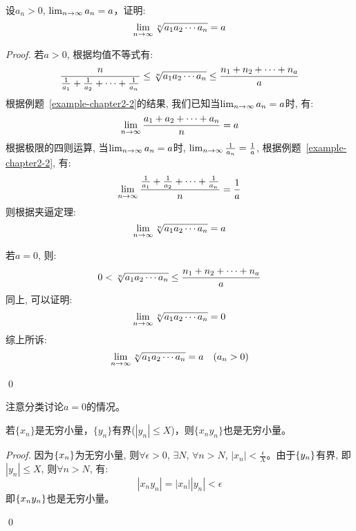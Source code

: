 \begin{example}
    设$a_n > 0$, $\lim_{n \to \infty } a_n = a$，证明:
    \begin{equation*}
        \lim_{n \to \infty } \sqrt[n]{a_1a_2\cdots a_n} = a
    \end{equation*}
\end{example}
\begin{proof}
    若$a > 0$, 根据均值不等式有:
    \begin{equation*}
        \frac{n}{\frac{1}{a_1}+\frac{1}{a_2}+\cdots+\frac{1}{a_n}} \le \sqrt[n]{a_1a_2\cdots a_n} \le \frac{n_1 + n_2 + \cdots + n_a}{a}
    \end{equation*}
    根据例题~\ref{example-chapter2-2}的结果, 我们已知当$\lim_{n \to \infty } a_n = a$时, 有:
    \begin{equation*}
        \lim_{n \to \infty } \frac{a_1 + a_2 + \cdots + a_n}{n} = a
    \end{equation*}
    根据极限的四则运算, 当$\lim_{n \to \infty } a_n = a$时, $\lim_{n \to \infty } \frac{1}{a_n} = \frac{1}{a}$, 根据例题~\ref{example-chapter2-2}, 有:
    \begin{equation*}
        \lim_{n \to \infty } \frac{\frac{1}{a_1}+\frac{1}{a_2}+\cdots+\frac{1}{a_n}}{n} = \frac{1}{a}
    \end{equation*}
    则根据夹逼定理:
    \begin{equation*}
        \lim_{n \to \infty } \sqrt[n]{a_1a_2\cdots a_n} = a
    \end{equation*}

    若$a = 0$, 则:
    \begin{equation*}
        0 < \sqrt[n]{a_1a_2\cdots a_n} \le \frac{n_1 + n_2 + \cdots + n_a}{a}
    \end{equation*}
    同上, 可以证明:
    \begin{equation*}
        \lim_{n \to \infty } \sqrt[n]{a_1a_2\cdots a_n} = 0
    \end{equation*}
    综上所诉:
    \begin{equation*}
        \lim_{n \to \infty } \sqrt[n]{a_1a_2\cdots a_n} = a \quad (a_n > 0)
    \end{equation*}    

    \qed
\end{proof}
\begin{remark}
    注意分类讨论$a = 0$的情况。
\end{remark}

\begin{proposition}
    若$\{ x_n \}$是无穷小量，$\{ y_n \}$有界($| y_n | \le X$)，则$\{ x_n y_n \}$也是无穷小量。
\end{proposition}
\begin{proof}
    因为$\left\{ x_n\right\}$为无穷小量, 则$\forall \epsilon > 0$, $\exists N$, $\forall n > N$, $|x_n| < \frac{\epsilon}{X}$。由于$\left\{ y_n\right\}$有界, 即$|y_n| \le X$, 则$\forall n > N$, 有: 
    \begin{equation*}
        |x_ny_n| = |x_n||y_n| < \epsilon
    \end{equation*}
    即$\left\{ x_ny_n\right\}$也是无穷小量。

    \qed
\end{proof}

